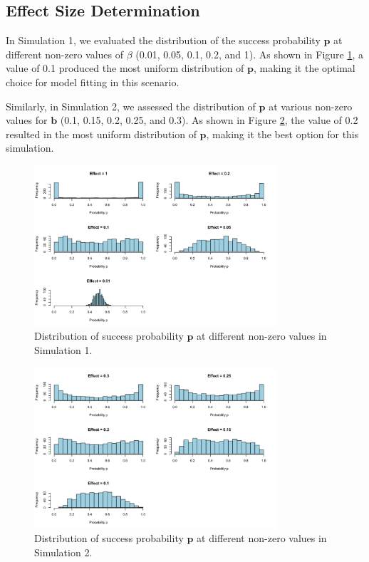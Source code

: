 \documentclass[12pt]{article}
\begin{document}
\subsection{Effect Size Determination}

In Simulation 1, we evaluated the distribution of the success probability \( \mathbf{p} \) at different non-zero values of \( \beta \) (0.01, 0.05, 0.1, 0.2, and 1). As shown in Figure \ref{fig:sim1_p_dist}, a value of 0.1 produced the most uniform distribution of \( \mathbf{p} \), making it the optimal choice for model fitting in this scenario.

Similarly, in Simulation 2, we assessed the distribution of \( \mathbf{p} \) at various non-zero values for \( \mathbf{b} \) (0.1, 0.15, 0.2, 0.25, and 0.3). As shown in Figure \ref{fig:sim2_p_dist}, the value of 0.2 resulted in the most uniform distribution of \( \mathbf{p} \), making it the best option for this simulation.

\begin{figure}[H]
	\centering
	\includegraphics[width=0.8\textwidth]{sim1_p_dist.png}
	\caption{Distribution of success probability \( \mathbf{p} \) at different non-zero values in Simulation 1.}
	\label{fig:sim1_p_dist}
\end{figure}

\begin{figure}[H]
	\centering
	\includegraphics[width=0.8\textwidth]{sim2_p_dist.png}
	\caption{Distribution of success probability \( \mathbf{p} \) at different non-zero values in Simulation 2.}
	\label{fig:sim2_p_dist}
\end{figure}
\end{document}
